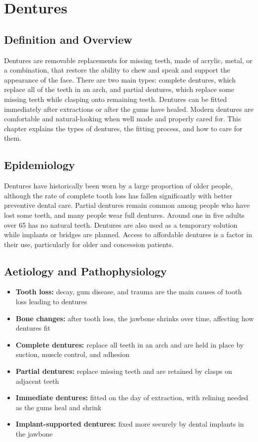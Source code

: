 \chapter{Dentures}

\section*{Definition and Overview}
Dentures are removable replacements for missing teeth, made of acrylic, metal, or a combination, that restore the ability to chew and speak and support the appearance of the face. There are two main types: complete dentures, which replace all of the teeth in an arch, and partial dentures, which replace some missing teeth while clasping onto remaining teeth. Dentures can be fitted immediately after extractions or after the gums have healed. Modern dentures are comfortable and natural-looking when well made and properly cared for. This chapter explains the types of dentures, the fitting process, and how to care for them.

\section*{Epidemiology}
Dentures have historically been worn by a large proportion of older people, although the rate of complete tooth loss has fallen significantly with better preventive dental care. Partial dentures remain common among people who have lost some teeth, and many people wear full dentures. Around one in five adults over 65 has no natural teeth. Dentures are also used as a temporary solution while implants or bridges are planned. Access to affordable dentures is a factor in their use, particularly for older and concession patients.

\section*{Aetiology and Pathophysiology}
\begin{itemize}
    \item \textbf{Tooth loss:} decay, gum disease, and trauma are the main causes of tooth loss leading to dentures
    \item \textbf{Bone changes:} after tooth loss, the jawbone shrinks over time, affecting how dentures fit
    \item \textbf{Complete dentures:} replace all teeth in an arch and are held in place by suction, muscle control, and adhesion
    \item \textbf{Partial dentures:} replace missing teeth and are retained by clasps on adjacent teeth
    \item \textbf{Immediate dentures:} fitted on the day of extraction, with relining needed as the gums heal and shrink
    \item \textbf{Implant-supported dentures:} fixed more securely by dental implants in the jawbone
\end{itemize}

